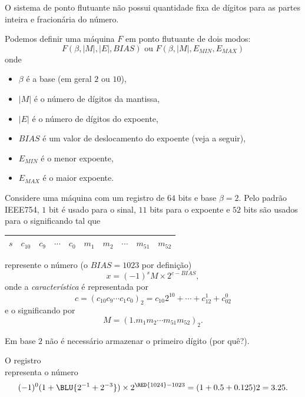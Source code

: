 O sistema de ponto flutuante não possui quantidade fixa de dígitos para as partes inteira e fracionária do número.

Podemos definir uma máquina $F$ em ponto flutuante de dois modos:
\begin{equation}  F(\beta,|M|,|E|,BIAS) \text{ ou } F(\beta,|M|,E_{MIN},E_{MAX}) \end{equation}
onde
\begin{itemize}
 \item $\beta$ é a base (em geral $2$ ou $10$),
 \item $|M|$ é o número de dígitos da mantissa,
 \item $|E|$ é o número de dígitos do expoente,
 \item $BIAS$ é um valor de deslocamento do expoente (veja a seguir),
 \item $E_{MIN}$ é o menor expoente,
 \item $E_{MAX}$ é o maior expoente.
\end{itemize}


Considere uma máquina com um registro de $64$ bits e base $\beta=2$. Pelo padrão IEEE754, $1$ bit é usado para o sinal, $11$ bits para o expoente e $52$ bits são usados para o significando tal que
\begin{center}
  \begin{tabular}{|c|c|c|c|c|c|c|c|c|c|}\hline
    $s$ & $c_{10}$ & $c_{9}$ & $\cdots$ & $c_{0}$ & $m_1$ & $m_2$ & $\cdots$ & $m_{51}$ & $m_{52}$\\\hline
  \end{tabular}
\end{center}
represente o número (o $BIAS=1023$ por definição)
\begin{equation}  x=(-1)^{s}M \times 2^{c-BIAS}, \end{equation}
onde a \emph{característica} é representada por
\begin{equation} c=(c_{10}c_9\cdots c_1c_0)_2=c_{10}2^{10}+\cdots+c_12^1+c_02^0  \end{equation}
e o significando por
\begin{equation} M=(1.m_1m_2\cdots m_{51}m_{52})_2. \end{equation}

\begin{obs}
  Em base $2$ não é necessário armazenar o primeiro dígito (por quê?).
\end{obs}

\begin{ex}
O registro
\begin{equation}
[0|\RED{100~0000~0000} |\BLU{101}0~0000~0000\ldots 0000~0000]
\end{equation}
representa o número
\begin{equation}
(-1)^0(1+\BLU{2^{-1}+2^{-3}})\times  2^{\RED{1024}-1023}=(1+0.5+0.125)2=3.25.
\end{equation}
\end{ex}


